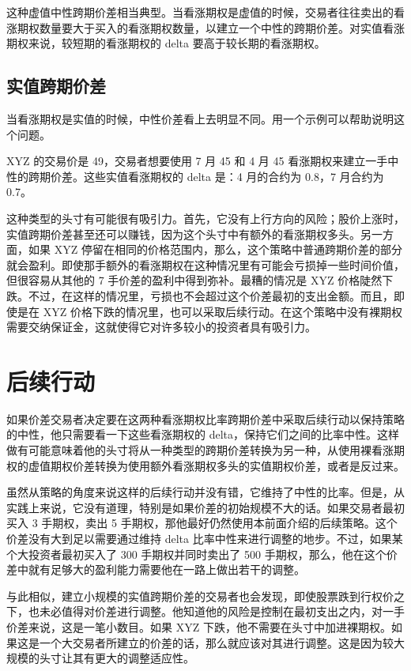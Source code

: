 这种虚值中性跨期价差相当典型。当看涨期权是虚值的时候，交易者往往卖出的看涨期权数量要大于买入的看涨期权数量，以建立一个中性的跨期价差。对实值看涨期权来说，较短期的看涨期权的 delta 要高于较长期的看涨期权。
\subsection{实值跨期价差}
当看涨期权是实值的时候，中性价差看上去明显不同。用一个示例可以帮助说明这个问题。

\begin{tcolorbox}
    XYZ 的交易价是 49，交易者想要使用 7 月 45 和 4 月 45 看涨期权来建立一手中性的跨期价差。这些实值看涨期权的 delta 是：4 月的合约为 0.8，7 月合约为 0.7。
\end{tcolorbox}

这种类型的头寸有可能很有吸引力。首先，它没有上行方向的风险；股价上涨时，实值跨期价差甚至还可以赚钱，因为这个头寸中有额外的看涨期权多头。另一方面，如果 XYZ 停留在相同的价格范围内，那么，这个策略中普通跨期价差的部分就会盈利。即使那手额外的看涨期权在这种情况里有可能会亏损掉一些时间价值，但很容易从其他的 7 手价差的盈利中得到弥补。最糟的情况是 XYZ 价格陡然下跌。不过，在这样的情况里，亏损也不会超过这个价差最初的支出金额。而且，即使是在 XYZ 价格下跌的情况里，也可以采取后续行动。在这个策略中没有裸期权需要交纳保证金，这就使得它对许多较小的投资者具有吸引力。

\section{后续行动}
如果价差交易者决定要在这两种看涨期权比率跨期价差中采取后续行动以保持策略的中性，他只需要看一下这些看涨期权的 delta，保持它们之间的比率中性。这样做有可能意味着他的头寸将从一种类型的跨期价差转换为另一种，从使用裸看涨期权的虚值期权价差转换为使用额外看涨期权多头的实值期权价差，或者是反过来。

虽然从策略的角度来说这样的后续行动并没有错，它维持了中性的比率。但是，从实践上来说，它没有道理，特别是如果价差的初始规模不大的话。如果交易者最初买入 3 手期权，卖出 5 手期权，那他最好仍然使用本前面介绍的后续策略。这个价差没有大到足以需要通过维持 delta 比率中性来进行调整的地步。不过，如果某个大投资者最初买入了 300 手期权并同时卖出了 500 手期权，那么，他在这个价差中就有足够大的盈利能力需要他在一路上做出若干的调整。

与此相似，建立小规模的实值跨期价差的交易者也会发现，即使股票跌到行权价之下，也未必值得对价差进行调整。他知道他的风险是控制在最初支出之内，对一手价差来说，这是一笔小数目。如果 XYZ 下跌，他不需要在头寸中加进裸期权。如果这是一个大交易者所建立的价差的话，那么就应该对其进行调整。这是因为较大规模的头寸让其有更大的调整适应性。
